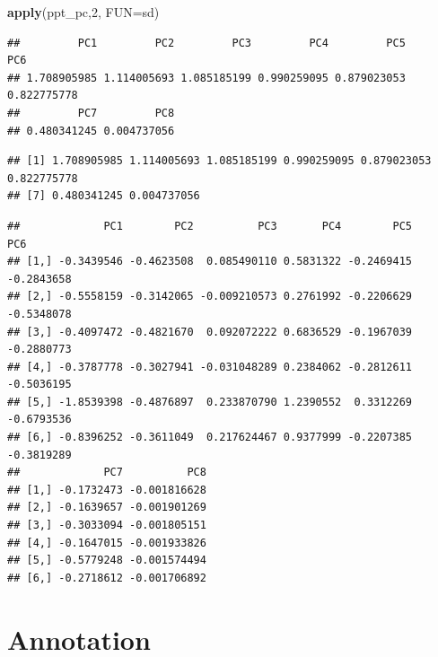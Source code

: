 \documentclass[]{article}
\newenvironment{Shaded}{\begin{snugshade}}{\end{snugshade}}
\newcommand{\DataTypeTok}[1]{\textcolor[rgb]{0.13,0.29,0.53}{#1}}
\newcommand{\DecValTok}[1]{\textcolor[rgb]{0.00,0.00,0.81}{#1}}
\newcommand{\KeywordTok}[1]{\textcolor[rgb]{0.13,0.29,0.53}{\textbf{#1}}}
\newcommand{\NormalTok}[1]{#1}
\newcommand{\OperatorTok}[1]{\textcolor[rgb]{0.81,0.36,0.00}{\textbf{#1}}}
\newcommand{\StringTok}[1]{\textcolor[rgb]{0.31,0.60,0.02}{#1}}
\begin{document}
\begin{Shaded}
\begin{Highlighting}[]
\KeywordTok{apply}\NormalTok{(ppt_pc,}\DecValTok{2}\NormalTok{, }\DataTypeTok{FUN=}\NormalTok{sd)}
\end{Highlighting}
\end{Shaded}

\begin{verbatim}
##         PC1         PC2         PC3         PC4         PC5         PC6 
## 1.708905985 1.114005693 1.085185199 0.990259095 0.879023053 0.822775778 
##         PC7         PC8 
## 0.480341245 0.004737056
\end{verbatim}

\begin{Shaded}
\end{Shaded}

\begin{verbatim}
## [1] 1.708905985 1.114005693 1.085185199 0.990259095 0.879023053 0.822775778
## [7] 0.480341245 0.004737056
\end{verbatim}

\begin{Shaded}
\end{Shaded}

\begin{verbatim}
##             PC1        PC2          PC3       PC4        PC5        PC6
## [1,] -0.3439546 -0.4623508  0.085490110 0.5831322 -0.2469415 -0.2843658
## [2,] -0.5558159 -0.3142065 -0.009210573 0.2761992 -0.2206629 -0.5348078
## [3,] -0.4097472 -0.4821670  0.092072222 0.6836529 -0.1967039 -0.2880773
## [4,] -0.3787778 -0.3027941 -0.031048289 0.2384062 -0.2812611 -0.5036195
## [5,] -1.8539398 -0.4876897  0.233870790 1.2390552  0.3312269 -0.6793536
## [6,] -0.8396252 -0.3611049  0.217624467 0.9377999 -0.2207385 -0.3819289
##             PC7          PC8
## [1,] -0.1732473 -0.001816628
## [2,] -0.1639657 -0.001901269
## [3,] -0.3033094 -0.001805151
## [4,] -0.1647015 -0.001933826
## [5,] -0.5779248 -0.001574494
## [6,] -0.2718612 -0.001706892
\end{verbatim}

\hypertarget{annotation}{%
\section{Annotation}\label{annotation}}
\end{document}
